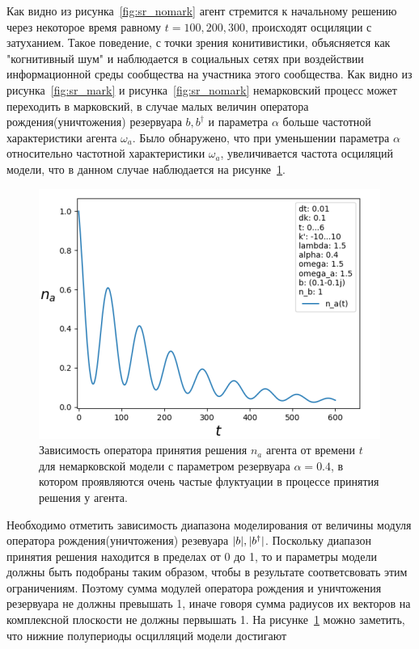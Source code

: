 Как видно из рисунка~\ref{fig:sr_nomark} агент стремится к начальному решению через некоторое время
равному $t = 100, 200, 300$, происходят осциляции с затуханием.
Такое поведение, с точки зрения конитивистики, объясняется как "когнитивный шум" и наблюдается в
социальных сетях при воздействии информационной среды сообщества на участника этого сообщества.
Как видно из рисунка~\ref{fig:sr_mark} и рисунка~\ref{fig:sr_nomark} немарковский процесс может
переходить в марковский, в случае малых величин оператора рождения(уничтожения) резервуара $b, b^{\dagger}$
и параметра $\alpha$ больше частотной характеристики агента $\omega_{a}$.
Было обнаружено, что при уменьшении параметра $\alpha$ относительно частотной характеристики $\omega_{a}$,
увеличивается частота осциляций модели, что в данном случае наблюдается на рисунке~\ref{fig:sr_more_oscillation}.
\newpage
\begin{figure}[h!]
    \centering
    \captionsetup{justification=centering}
    \includegraphics[width=0.7\linewidth]{pictures/result_second_3.png}
    \caption{Зависимость оператора принятия решения $n_{a}$ агента от времени $t$ для немарковской модели
    с параметром резервуара $\alpha = 0.4$, в котором проявляются очень частые флуктуации в процессе принятия решения у агента.}
    \label{fig:sr_more_oscillation}
\end{figure}
Необходимо отметить зависимость диапазона моделирования от величины модуля оператора рождения(уничтожения)
резевуара $\arrowvert b \arrowvert, \arrowvert b^{\dagger} \arrowvert$.
Поскольку диапазон принятия решения находится в пределах от 0 до 1, то и параметры модели должны быть
подобраны таким образом, чтобы в результате соответсвовать этим ограничениям.
Поэтому сумма модулей оператора рождения и уничтожения резервуара не должны превышать 1, иначе говоря
сумма радиусов их векторов на комплексной плоскости не должны первышать 1.
На рисунке~\ref{fig:sr_more_oscillation} можно заметить, что нижние полупериоды осцилляций модели достигают
